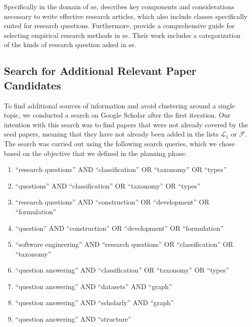 Specifically in the domain of \gls{se}, \textcite{shaw_writing_2003} describes key components and considerations necessary to write effective research articles, which also include classes specifically suited for research questions. Furthermore, \textcite[287-290]{easterbrook_selecting_2008} provide a comprehensive guide for selecting empirical research methods in \gls{se}. Their work includes a categorization of the kinds of research question asked in \gls{se}.

\subsection{Search for Additional Relevant Paper Candidates}

To find additional sources of information and avoid clustering around a single topic, we conducted a search on Google Scholar after the first iteration. Our intention with this search was to find papers that were not already covered by the seed papers, meaning that they have not already been added in the lists $\mathcal{L}_1$ or $\mathcal{F}$. The search was carried out using the following search queries, which we chose based on the objective that we defined in the planning phase:

\begin{enumerate}[label=\textbf{Q\arabic*:}, leftmargin=5em]
    \item \enquote{research questions} AND \enquote{classification} OR \enquote{taxonomy} OR \enquote{types}
    \item \enquote{questions} AND \enquote{classification} OR \enquote{taxonomy} OR \enquote{types}
    \item \enquote{research questions} AND \enquote{construction} OR \enquote{development} OR \enquote{formulation}
    \item \enquote{question} AND \enquote{construction} OR \enquote{development} OR \enquote{formulation}
    \item \enquote{software engineering} AND \enquote{research questions} OR \enquote{classification} OR \enquote{taxonomy}
    \item \enquote{question answering} AND \enquote{classification} OR \enquote{taxonomy} OR \enquote{types}
    \item \enquote{question answering} AND \enquote{datasets} AND \enquote{graph}
    \item \enquote{question answering} AND \enquote{scholarly} AND \enquote{graph}
    \item \enquote{question answering} AND \enquote{structure}
\end{enumerate}

